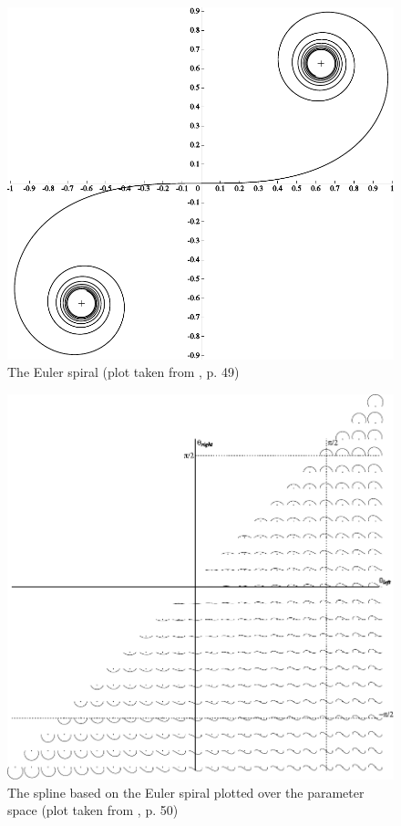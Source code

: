 \begin{figure}
\includegraphics[width=\textwidth]{images/smooth/euler_spiral.pdf}
\caption{The Euler spiral (plot taken from \cite{levien2009spiral}, p. 49)}
\end{figure}
\begin{figure}
\includegraphics[width=\textwidth]{images/smooth/euler_spline_primitive.pdf}
\caption{The spline based on the Euler spiral plotted over the parameter space (plot taken from \cite{levien2009spiral}, p. 50)}
\end{figure}


